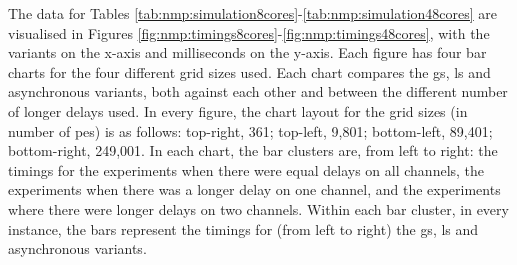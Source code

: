 \begin{table}
\centering
{}
\caption[Mean recorded running times for each \acrlong{nmp} variant on a 48-core CPU]{Mean recorded running times in milliseconds for each \gls{nmp} variant in a simulation, with different sending delay lengths, on a computer with a CPU with 24/48 physical/logical cores}
\label{tab:nmp:simulation48cores}
\end{table}

The data for Tables \ref{tab:nmp:simulation8cores}-\ref{tab:nmp:simulation48cores} are visualised in Figures \ref{fig:nmp:timings8cores}-\ref{fig:nmp:timings48cores}, with the variants on the x-axis and milliseconds on the y-axis.  Each figure has four bar charts for the four different grid sizes used.  Each chart compares the \gls{gs}, \gls{ls} and asynchronous variants, both against each other and between the different number of longer delays used.  In every figure, the chart layout for the grid sizes (in number of \glspl{pe}) is as follows:  top-right, 361;  top-left, 9,801;  bottom-left, 89,401;  bottom-right, 249,001.  In each chart, the bar clusters are, from left to right:  the timings for the experiments when there were equal delays on all channels, the experiments when there was a longer delay on one channel, and the experiments where there were longer delays on two channels.  Within each bar cluster, in every instance, the bars represent the timings for (from left to right) the \gls{gs}, \gls{ls} and asynchronous variants.

